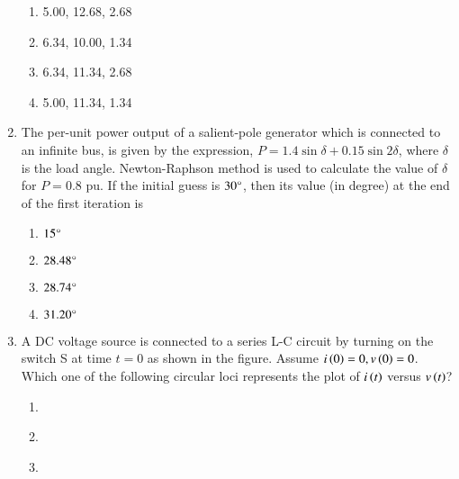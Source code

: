\documentclass[journal]{IEEEtran}
\begin{document}
\begin{enumerate}
 \begin{figure}[!ht]
    \centering
    \label{fig:power system network}
    \end{figure}
\begin{enumerate}
    \item 5.00, 12.68, 2.68
    \item 6.34, 10.00, 1.34
    \item 6.34, 11.34, 2.68
    \item 5.00, 11.34, 1.34
\end{enumerate}
\item The per-unit power output of a salient-pole generator which is connected to an infinite bus, is given by the expression, $P = 1.4 \sin \delta + 0.15 \sin 2\delta$, where $\delta$ is the load angle. Newton-Raphson method is used to calculate the value of $\delta$ for $P = 0.8$ pu. If the initial guess is $30\degree$, then its value (in degree) at the end of the first iteration is 
\begin{enumerate}
    \item $15\degree$
    \item $28.48\degree$
    \item $28.74\degree$
    \item $31.20\degree$
\end{enumerate}
\item A DC voltage source is connected to a series L-C circuit by turning on the switch S at time $t = 0$ as shown in the figure. Assume $i\left(0\right) = 0, v\left(0\right) = 0$. Which one of the following circular loci represents the plot of $i\left(t\right)$ versus $v\left(t\right)$?
 \begin{figure}[!ht]
    \centering
    \label{fig:L-C circuit}
    \end{figure}
\begin{enumerate}
     \item  \begin{figure}[!ht]
    \label{fig:a}
    \end{figure}
    \item \begin{figure}[!ht]
    \label{fig:b}
    \end{figure}
    \item \begin{figure}[!ht]

\end{figure}
\end{enumerate}
\end{enumerate}
\end{document}
